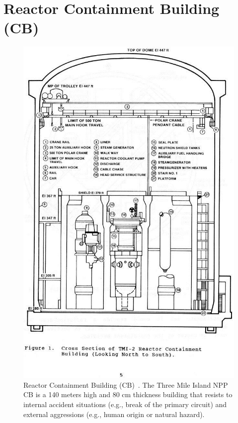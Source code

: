 \chapter{Reactor Containment Building (CB)}
\label{ch:reactor_building}
\begin{figure}[H]
    \centering
    \vspace{-1cm}
    \includegraphics[width=0.5\linewidth]{figures/reactor_building.jpg}
    \caption{Reactor Containment Building (CB)~\cite{ONR-cs-br}. The Three Mile Island NPP CB is a 140 meters high and 80 cm thickness building that resists to internal accident situations (e.g., break of the primary circuit) and external aggressions (e.g., human origin or natural hazard).}
    \label{fig:reactor_building}
\end{figure}


